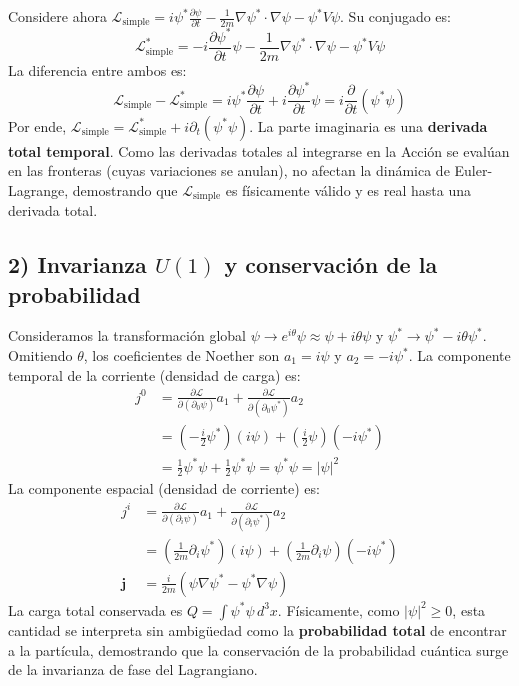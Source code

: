 Considere ahora $\mathcal{L}_{\text{simple}} = i\psi^* \frac{\partial \psi}{\partial t} - \frac{1}{2m} \nabla\psi^* \cdot \nabla\psi - \psi^* V \psi$. Su conjugado es:
\begin{equation}
    \mathcal{L}_{\text{simple}}^* = -i\frac{\partial \psi^*}{\partial t}\psi - \frac{1}{2m} \nabla\psi^* \cdot \nabla\psi - \psi^* V \psi
\end{equation}
La diferencia entre ambos es:
\begin{equation}
    \mathcal{L}_{\text{simple}} - \mathcal{L}_{\text{simple}}^* = i\psi^* \frac{\partial \psi}{\partial t} + i\frac{\partial \psi^*}{\partial t}\psi = i \frac{\partial}{\partial t}(\psi^*\psi)
\end{equation}
Por ende, $\mathcal{L}_{\text{simple}} = \mathcal{L}_{\text{simple}}^* + i \partial_t(\psi^*\psi)$. La parte imaginaria es una \textbf{derivada total temporal}. Como las derivadas totales al integrarse en la Acción se evalúan en las fronteras (cuyas variaciones se anulan), no afectan la dinámica de Euler-Lagrange, demostrando que $\mathcal{L}_{\text{simple}}$ es físicamente válido y es real hasta una derivada total.


\subsection*{2) Invarianza $U(1)$ y conservación de la probabilidad}
Consideramos la transformación global $\psi \to e^{i\theta}\psi \approx \psi + i\theta\psi$ y $\psi^* \to \psi^* - i\theta\psi^*$. Omitiendo $\theta$, los coeficientes de Noether son $a_1 = i\psi$ y $a_2 = -i\psi^*$.
La componente temporal de la corriente (densidad de carga) es:
\begin{align}
    j^0 &= \frac{\partial \mathcal{L}}{\partial(\partial_0 \psi)} a_1 + \frac{\partial \mathcal{L}}{\partial(\partial_0 \psi^*)} a_2 \nonumber \\
    &= \left(-\frac{i}{2}\psi^*\right)(i\psi) + \left(\frac{i}{2}\psi\right)(-i\psi^*) \nonumber \\
    &= \frac{1}{2}\psi^*\psi + \frac{1}{2}\psi^*\psi = \psi^*\psi = |\psi|^2
\end{align}
La componente espacial (densidad de corriente) es:
\begin{align}
    j^i &= \frac{\partial \mathcal{L}}{\partial(\partial_i \psi)} a_1 + \frac{\partial \mathcal{L}}{\partial(\partial_i \psi^*)} a_2 \nonumber \\
    &= \left(\frac{1}{2m}\partial_i\psi^*\right)(i\psi) + \left(\frac{1}{2m}\partial_i\psi\right)(-i\psi^*) \nonumber \\
    \mathbf{j} &= \frac{i}{2m}(\psi \nabla\psi^* - \psi^* \nabla\psi)
\end{align}
La carga total conservada es $Q = \int \psi^*\psi \, d^3x$. Físicamente, como $|\psi|^2 \ge 0$, esta cantidad se interpreta sin ambigüedad como la \textbf{probabilidad total} de encontrar a la partícula, demostrando que la conservación de la probabilidad cuántica surge de la invarianza de fase del Lagrangiano.

